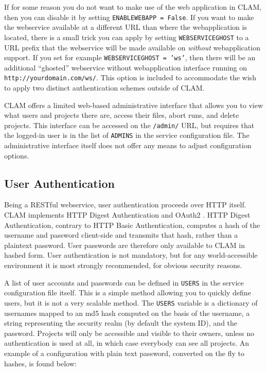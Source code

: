 \documentclass[a4paper,12pt,twoside,openright]{report}
\begin{document}
If for some reason you do not want to make use of the web application in CLAM,
then you can disable it by setting \texttt{ENABLEWEBAPP = False}. If you want
to make the webservice available at a different URL than where the
webapplication is located, there is a small trick you can apply by setting
\texttt{WEBSERVICEGHOST} to a URL prefix that the webservice will be made
available on \emph{without} webapplication support. If you set for example
\texttt{WEBSERVICEGHOST = 'ws'}, then there will be an additional ``ghosted''
webservice without webapplication interface running on
\texttt{http://yourdomain.com/ws/}. This option is included to accommodate the
wish to apply two distinct authentication schemes outside of CLAM. 

CLAM offers a limited web-based administrative interface that allows you to
view what users and projects there are,  access their files, abort runs, and
delete projects. This interface can be accessed on the \texttt{/admin/} URL,
but requires that the logged-in user is in the list of \texttt{ADMINS} in the
service configuration file. The administrative interface itself does not offer
any means to adjust configuration options.

\subsection{User Authentication}

Being a RESTful webservice, user authentication proceeds over HTTP itself. CLAM
implements HTTP Digest Authentication \cite{HTTPAUTH} and OAuth2 \cite{OAUTH2}. HTTP Digest
Authentication, contrary to HTTP Basic Authentication, computes a hash of the
username and password client-side and transmits that hash, rather than a
plaintext password. User passwords are therefore only available to CLAM in
hashed form. User authentication is not mandatory, but for any world-accessible
environment it is most strongly recommended, for obvious security reasons. 

A list of user accounts and passwords can be defined in \texttt{USERS} in the
service configuration file itself. This is a simple method allowing you to
quickly define users, but it is not a very scalable method. The \texttt{USERS}
variable is a dictionary of usernames mapped to an md5 hash computed on the
basis of the username, a string representing the security realm (by default the
system ID), and the password. Projects will only be accessible and visible to
their owners, unless no authentication is used at all, in which case everybody
can see all projects. An example of a configuration with plain text password,
converted on the fly to hashes, is found below:
\end{document}
